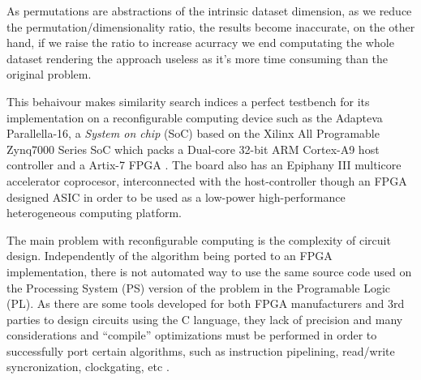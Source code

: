 \documentclass[11pt,letterpaper]{article}
\begin{document}
    As permutations are abstractions of the intrinsic dataset dimension, as we reduce the permutation/dimensionality 
    ratio, the results become inaccurate, on the other hand, if we raise the ratio to increase acurracy we end 
    computating the whole dataset rendering the approach useless as it's more time consuming than the original 
    problem.

    This behaivour makes similarity search indices a perfect testbench for its implementation on a reconfigurable
    computing device\cite{5999889} such as the Adapteva Parallella-16, a \emph{System on chip} (SoC) based on the 
    Xilinx All Programable Zynq7000 Series SoC which packs a Dual-core 32-bit ARM Cortex-A9 host controller and a 
    Artix-7 FPGA \cite{DBLP:journals/corr/OlofssonNZ14,LINLEY_1}.
    The board also has an Epiphany III multicore accelerator coprocesor, interconnected with the host-controller
    though an FPGA designed ASIC in order to be used as a low-power high-performance heterogeneous computing 
    platform.

    The main problem with reconfigurable computing is the complexity of circuit design\cite{SPA_thesis}. 
    Independently of the algorithm being ported to an FPGA implementation, there is not automated way to use
    the same source code used on the Processing System (PS) version of the problem in the Programable Logic (PL). 
    As there are some tools developed for both FPGA manufacturers and 3rd parties to design circuits using the C 
    language, they lack of precision and many considerations and ``compile'' optimizations must be performed 
    in order to successfully port certain algorithms\cite{SPA_thesis}, such as instruction pipelining, read/write 
    syncronization, clockgating\cite{XILINX_clockgating}, etc \cite{XILINX_axi,XILINX_clockgating,
    XILINX_ddr_rate,XILINX_mem_interface}.

\end{document}
